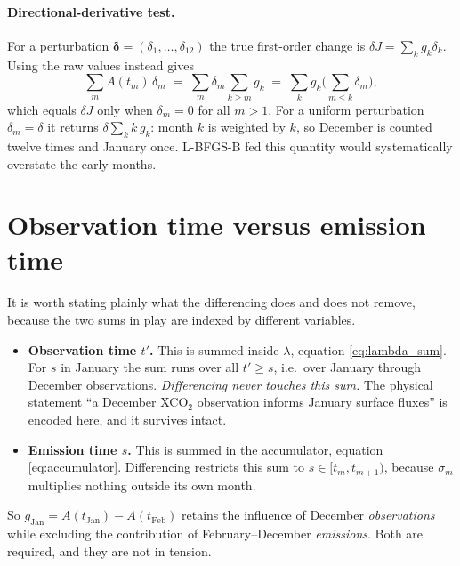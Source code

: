 \documentclass[12pt]{article}
\newcommand{\bm}[1]{\mathbf{#1}}
\newcommand{\Adj}{A}
\begin{document}
\paragraph{Directional-derivative test.} For a perturbation
$\bm{\delta} = (\delta_1,\dots,\delta_{12})$ the true first-order change is
$\delta J = \sum_k g_k \delta_k$. Using the raw values instead gives
%
\begin{equation}
  \sum_m \Adj(t_m)\,\delta_m
  \;=\; \sum_m \delta_m \sum_{k \ge m} g_k
  \;=\; \sum_k g_k \Big( \sum_{m \le k} \delta_m \Big),
\end{equation}
%
which equals $\delta J$ only when $\delta_m = 0$ for all $m > 1$. For a uniform
perturbation $\delta_m = \delta$ it returns $\delta \sum_k k\, g_k$: month $k$ is
weighted by $k$, so December is counted twelve times and January once. L-BFGS-B fed
this quantity would systematically overstate the early months.

\section{Observation time versus emission time}

It is worth stating plainly what the differencing does and does not remove, because
the two sums in play are indexed by different variables.

\begin{itemize}
  \item \textbf{Observation time $t'$.} This is summed inside $\lambda$, equation
        \eqref{eq:lambda_sum}. For $s$ in January the sum runs over all $t' \ge s$,
        i.e.\ over January through December observations. \emph{Differencing never
        touches this sum.} The physical statement ``a December XCO$_2$ observation
        informs January surface fluxes'' is encoded here, and it survives intact.

  \item \textbf{Emission time $s$.} This is summed in the accumulator, equation
        \eqref{eq:accumulator}. Differencing restricts this sum to
        $s \in [t_m, t_{m+1})$, because $\sigma_m$ multiplies nothing outside its own
        month.
\end{itemize}

So $g_{\mathrm{Jan}} = \Adj(t_{\mathrm{Jan}}) - \Adj(t_{\mathrm{Feb}})$ retains the
influence of December \emph{observations} while excluding the contribution of
February--December \emph{emissions}. Both are required, and they are not in tension.
\end{document}
